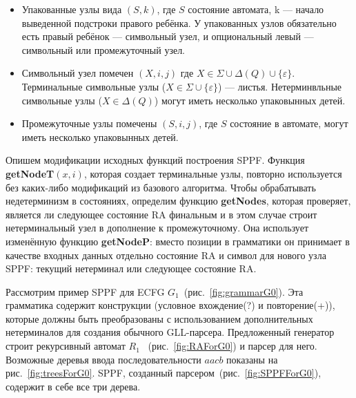 \documentclass[14pt]{matmex-diploma-custom}
\begin{document}
	\begin{itemize}
		\item Упакованные узлы вида $(S, k)$, где $S$ состояние автомата, k --- начало выведенной
		подстроки правого ребёнка. У упакованных узлов обязательно есть правый ребёнок ---
		символьный узел, и опциональный левый --- символьный или промежуточный узел.
		\item Символьный узел помечен $(X, i, j)$ где $X \in \Sigma \cup \Delta(Q) \cup \{\varepsilon\}$.
		Терминальные символьные узлы ($X \in \Sigma \cup \{\varepsilon\}$) --- листья. 
		Нетерминвльные символьные узлы ($X \in \Delta(Q)$) могут иметь несколько упаковынных детей. 
		\item Промежуточные узлы помечены $ (S, i, j) $, где $S$ состояние в автомате, могут иметь несколько упаковынных детей.
	\end{itemize}
	
	Опишем модификации исходных функций построения SPPF.
	Функция \textbf{getNodeT$ (x, i) $}, которая создает терминальные узлы, 
	повторно используется без каких-либо модификаций из базового алгоритма.
	Чтобы обрабатывать недетерминизм в состояниях, определим функцию 
	\textbf{getNodes}, которая проверяет, является ли следующее состояние RA финальным
	и в этом случае строит нетерминальный узел в дополнение к промежуточному.
	Она использует изменённую функцию \textbf{getNodeP}: вместо позиции в грамматики он 
	принимает в качестве входных данных отдельно состояние RA и символ для нового узла SPPF:
	текущий нетерминал или следующее состояние RA.
	
	
	
	
	Рассмотрим пример SPPF для ECFG $ G_1 $~(рис.~\ref{fig:grammarG0}).
	Эта грамматика содержит конструкции (условное вхождение(?) и повторение(+)),
	которые должны быть преобразованы с использованием дополнительных нетерминалов 
	для создания обычного GLL-парсера.
	Предложенный генератор строит рекурсивный автомат $ R_1 $ ~(рис.~\ref{fig:RAForG0})
	и парсер для него. Возможные деревья ввода последовательности $ aacb $ показаны 
	на рис.~\ref{fig:treesForG0}. SPPF, созданный парсером~(рис.~\ref{fig:SPPFForG0}),
	содержит в себе все три дерева.
	
\end{document}

